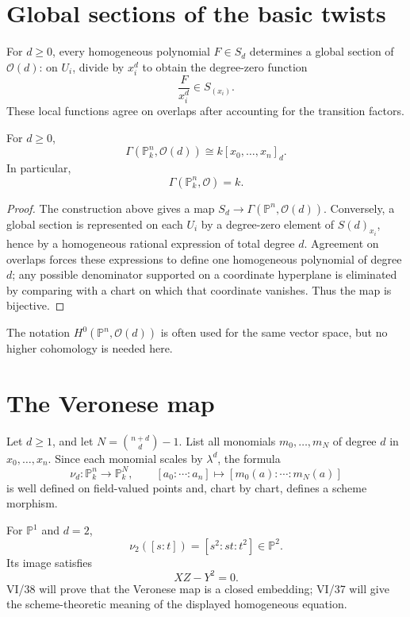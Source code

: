 

\section{Global sections of the basic twists}
For \(d\ge0\), every homogeneous polynomial \(F\in S_d\) determines a global section of \(\mathcal O(d)\): on \(U_i\), divide by \(x_i^d\) to obtain the degree-zero function
\[
\frac{F}{x_i^d}\in S_{(x_i)}.
\]
These local functions agree on overlaps after accounting for the transition factors.

\begin{theorem}\label{thm:vi36-global-sections}
For \(d\ge0\),
\[
\boxed{\Gamma(\mathbb P^n_k,\mathcal O(d))\cong k[x_0,\ldots,x_n]_d.}
\]
In particular,
\[
\Gamma(\mathbb P^n_k,\mathcal O)=k.
\]
\end{theorem}

\begin{proof}
The construction above gives a map \(S_d\to\Gamma(\mathbb P^n,\mathcal O(d))\).  Conversely, a global section is represented on each \(U_i\) by a degree-zero element of \(S(d)_{x_i}\), hence by a homogeneous rational expression of total degree \(d\).  Agreement on overlaps forces these expressions to define one homogeneous polynomial of degree \(d\); any possible denominator supported on a coordinate hyperplane is eliminated by comparing with a chart on which that coordinate vanishes.  Thus the map is bijective.
\end{proof}

The notation \(H^0(\mathbb P^n,\mathcal O(d))\) is often used for the same vector space, but no higher cohomology is needed here.

\section{The Veronese map}
Let \(d\ge1\), and let \(N=\binom{n+d}{d}-1\).  List all monomials \(m_0,\ldots,m_N\) of degree \(d\) in \(x_0,\ldots,x_n\).  Since each monomial scales by \(\lambda^d\), the formula
\[
\nu_d:\mathbb P^n_k\longrightarrow\mathbb P^N_k,
\qquad
[a_0:\cdots:a_n]\longmapsto[m_0(a):\cdots:m_N(a)]
\]
is well defined on field-valued points and, chart by chart, defines a scheme morphism.

For \(\mathbb P^1\) and \(d=2\),
\[
\nu_2([s:t])=[s^2:st:t^2]\in\mathbb P^2.
\]
Its image satisfies
\[
XZ-Y^2=0.
\]
VI/38 will prove that the Veronese map is a closed embedding; VI/37 will give the scheme-theoretic meaning of the displayed homogeneous equation.

